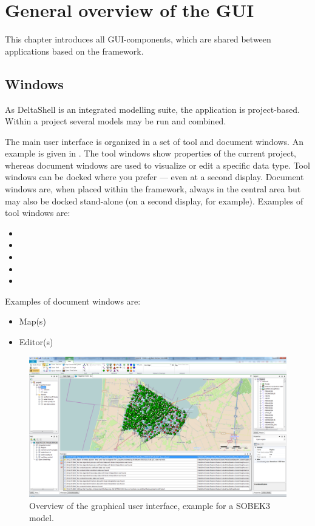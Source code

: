 
\chapter{General overview of the GUI}
\label{chap:rt_overview}

This chapter introduces all GUI-components, which are shared between applications based on the framework.
%
\section{Windows}
\label{sec:windows}
As DeltaShell is an integrated modelling suite, the application is project-based. Within a project several models may be run and combined.

The main user interface is organized in a set of tool and document windows. An example is given in . The tool windows show properties of the current project, whereas document windows are used to visualize or edit a specific data type. Tool windows can be docked where you prefer --- even at a second display. Document windows are, when placed within the framework, always in the central area but may also be docked stand-alone (on a second display, for example). Examples of tool windows are:
%
\begin{itemize}
	\item {}
	\item {}
	\item {}
	\item {}
	\item {}
\end{itemize}
%
Examples of document windows are:
%
\begin{itemize}
	\item Map(s)
	\item Editor(s)
\end{itemize}
%
\begin{figure} [H]
	\centering
		\includegraphics[width=\textwidth]{figures/chapter_overview/overview_ds}
	\caption{Overview of the graphical user interface, example for a SOBEK3 model.}
	\label{fig:fig3.1}
\end{figure}
